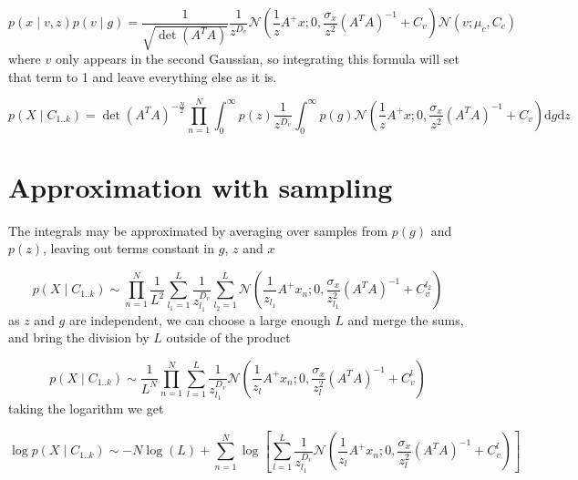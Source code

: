 \documentclass{paper}
\begin{document}
\begin{equation} 
p(x \mid v,z) p(v \mid g) = \frac{1}{\sqrt{\det(A^TA)}} \frac{1}{z^{D_v}} \mathcal{N}(\frac{1}{z}A^{+}x;0,\frac{\sigma_x}{z^2} (A^TA)^{-1} + C_v) \mathcal{N}(v; \mu_c,C_c)
\end{equation}
%
where $v$ only appears in the second Gaussian, so integrating this formula will set that term to 1 and leave everything else as it is.

\begin{equation}
p(X \mid C_{1..k}) =  \det(A^T A)^{-\frac{N}{2}} \prod_{n=1}^N \int_{0}^{\infty} p(z) \frac{1}{z^{D_v}}  \int_{0}^{\infty}  p(g) \mathcal{N}(\frac{1}{z} A^{+}x; 0,\frac{\sigma_x}{z^2} (A^T A)^{-1} + C_v) \mathrm{d}g \mathrm{d}z
\end{equation}

\section{Approximation with sampling}

The integrals may be approximated by averaging over samples from $p(g)$ and $p(z)$, leaving out terms constant in $g$, $z$ and $x$

\begin{equation}
p(X \mid C_{1..k}) \sim \prod_{n=1}^N  \frac{1}{L^2} \sum_{l_1=1}^L \frac{1}{z_{l_1}^{D_v}}  \sum_{l_2=1}^L \mathcal{N}(\frac{1}{z_{l_1}} A^{+}x_n; 0,\frac{\sigma_x}{z_{l_1}^2} (A^T A)^{-1} + C_v^{l_2})
\end{equation}
% 
as $z$ and $g$ are independent, we can choose a large enough $L$ and merge the sums, and bring the division by $L$ outside of the product

\begin{equation}
p(X \mid C_{1..k}) \sim \frac{1}{L^N} \prod_{n=1}^N  \sum_{l=1}^L \frac{1}{z_{l_1}^{D_v}}  \mathcal{N}(\frac{1}{z_l} A^{+}x_n; 0,\frac{\sigma_x}{z_l^2} (A^T A)^{-1} + C_v^l)
\end{equation}
%
taking the logarithm we get

\begin{equation}
\log p(X \mid C_{1..k}) \sim - N \log(L) + \sum_{n=1}^N \log \left[ \sum_{l=1}^L \frac{1}{z_{l_1}^{D_v}}  \mathcal{N}(\frac{1}{z_l} A^{+}x_n; 0,\frac{\sigma_x}{z_l^2} (A^T A)^{-1} + C_v^l) \right]
\end{equation}
\end{document}

